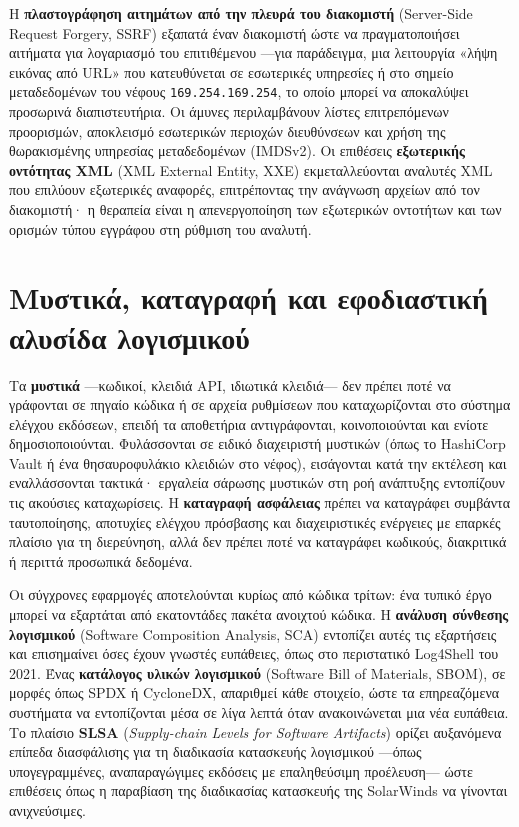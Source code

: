 Η \textbf{πλαστογράφηση αιτημάτων από την πλευρά του διακομιστή} (Server-Side Request Forgery, SSRF) εξαπατά έναν διακομιστή ώστε να πραγματοποιήσει αιτήματα για λογαριασμό του επιτιθέμενου —για παράδειγμα, μια λειτουργία «λήψη εικόνας από URL» που κατευθύνεται σε εσωτερικές υπηρεσίες ή στο σημείο μεταδεδομένων του νέφους \texttt{169.254.169.254}, το οποίο μπορεί να αποκαλύψει προσωρινά διαπιστευτήρια. Οι άμυνες περιλαμβάνουν λίστες επιτρεπόμενων προορισμών, αποκλεισμό εσωτερικών περιοχών διευθύνσεων και χρήση της θωρακισμένης υπηρεσίας μεταδεδομένων (IMDSv2). Οι επιθέσεις \textbf{εξωτερικής οντότητας XML} (XML External Entity, XXE) εκμεταλλεύονται αναλυτές XML που επιλύουν εξωτερικές αναφορές, επιτρέποντας την ανάγνωση αρχείων από τον διακομιστή· η θεραπεία είναι η απενεργοποίηση των εξωτερικών οντοτήτων και των ορισμών τύπου εγγράφου στη ρύθμιση του αναλυτή.

\section{Μυστικά, καταγραφή και εφοδιαστική αλυσίδα λογισμικού}\label{sec:9.6}
Τα \textbf{μυστικά} —κωδικοί, κλειδιά API, ιδιωτικά κλειδιά— δεν πρέπει ποτέ να γράφονται σε πηγαίο κώδικα ή σε αρχεία ρυθμίσεων που καταχωρίζονται στο σύστημα ελέγχου εκδόσεων, επειδή τα αποθετήρια αντιγράφονται, κοινοποιούνται και ενίοτε δημοσιοποιούνται. Φυλάσσονται σε ειδικό διαχειριστή μυστικών (όπως το HashiCorp Vault ή ένα θησαυροφυλάκιο κλειδιών στο νέφος), εισάγονται κατά την εκτέλεση και εναλλάσσονται τακτικά· εργαλεία σάρωσης μυστικών στη ροή ανάπτυξης εντοπίζουν τις ακούσιες καταχωρίσεις. Η \textbf{καταγραφή ασφάλειας} πρέπει να καταγράφει συμβάντα ταυτοποίησης, αποτυχίες ελέγχου πρόσβασης και διαχειριστικές ενέργειες με επαρκές πλαίσιο για τη διερεύνηση, αλλά δεν πρέπει ποτέ να καταγράφει κωδικούς, διακριτικά ή περιττά προσωπικά δεδομένα.

Οι σύγχρονες εφαρμογές αποτελούνται κυρίως από κώδικα τρίτων: ένα τυπικό έργο μπορεί να εξαρτάται από εκατοντάδες πακέτα ανοιχτού κώδικα. Η \textbf{ανάλυση σύνθεσης λογισμικού} (Software Composition Analysis, SCA) εντοπίζει αυτές τις εξαρτήσεις και επισημαίνει όσες έχουν γνωστές ευπάθειες, όπως στο περιστατικό Log4Shell του 2021. Ένας \textbf{κατάλογος υλικών λογισμικού} (Software Bill of Materials, SBOM), σε μορφές όπως SPDX ή CycloneDX, απαριθμεί κάθε στοιχείο, ώστε τα επηρεαζόμενα συστήματα να εντοπίζονται μέσα σε λίγα λεπτά όταν ανακοινώνεται μια νέα ευπάθεια. Το πλαίσιο \textbf{SLSA} (\emph{Supply-chain Levels for Software Artifacts}) ορίζει αυξανόμενα επίπεδα διασφάλισης για τη διαδικασία κατασκευής λογισμικού —όπως υπογεγραμμένες, αναπαραγώγιμες εκδόσεις με επαληθεύσιμη προέλευση— ώστε επιθέσεις όπως η παραβίαση της διαδικασίας κατασκευής της SolarWinds να γίνονται ανιχνεύσιμες.

